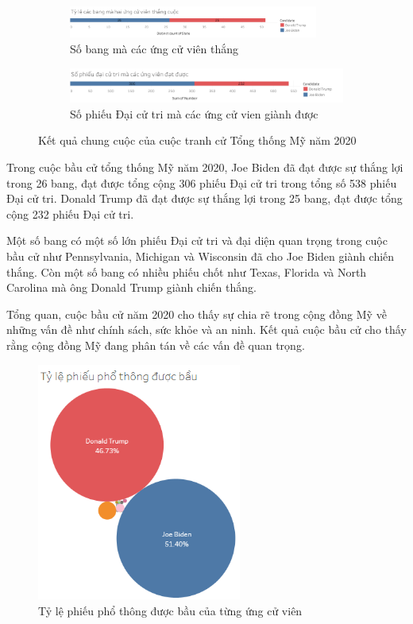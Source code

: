 \documentclass[14pt, a4paper]{article}
\numberwithin{equation}{section}
\numberwithin{figure}{section}
\numberwithin{dl}{section}
\numberwithin{md}{section}
\numberwithin{bd}{section}
\numberwithin{dn}{section}
\numberwithin{hq}{section}
\begin{document}
    \begin{figure}[h!]
        \centering
        \begin{subfigure}[b]{\textwidth}
            \includegraphics[width=0.9\textwidth]{figures/State_Candidate_Win.png}
            \caption{Số bang mà các ứng cử viên thắng}
        \end{subfigure}
        \vfill
        \begin{subfigure}[b]{\linewidth}
            \includegraphics[width=0.9\linewidth]{figures/Electoral_Vote_Candidate_Win.png}
            \caption{Số phiếu Đại cử tri mà các ứng cử vien giành được}
        \end{subfigure}
        \caption{Kết quả chung cuộc của cuộc tranh cử Tổng thống Mỹ năm 2020}
    \end{figure}

    Trong cuộc bầu cử tổng thống Mỹ năm 2020, Joe Biden đã đạt được sự thắng lợi trong 26 bang, đạt được tổng cộng 306 phiếu Đại cử tri trong tổng số 538 phiếu Đại cử tri. 
    Donald Trump đã đạt được sự thắng lợi trong 25 bang, đạt được tổng cộng 232 phiếu Đại cử tri.

    Một số bang có một số lớn phiếu Đại cử tri và đại diện quan trọng trong cuộc bầu cử như Pennsylvania, Michigan và Wisconsin đã cho Joe Biden giành chiến thắng. 
    Còn một số bang có nhiều phiếu chốt như Texas, Florida và North Carolina mà ông Donald Trump giành chiến thắng.

    Tổng quan, cuộc bầu cử năm 2020 cho thấy sự chia rẽ trong cộng đồng Mỹ về những vấn đề như chính sách, sức khỏe và an ninh. 
    Kết quả cuộc bầu cử cho thấy rằng cộng đồng Mỹ đang phân tán về các vấn đề quan trọng.

    \begin{figure}[h!]
        \centering
        \includegraphics[width=0.6\textwidth]{Percentage_Total_Candidates_Bubble_Chart.png}
        \caption{Tỷ lệ phiếu phổ thông được bầu của từng ứng cử viên}
    \end{figure}
\end{document}
